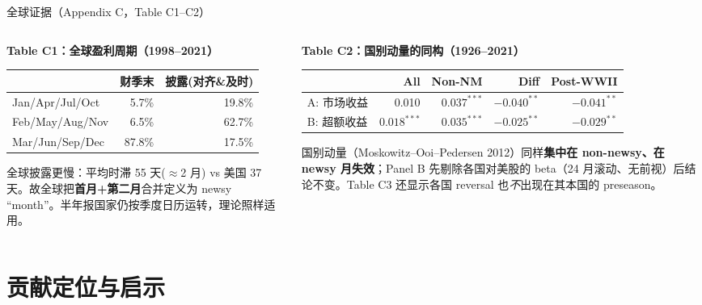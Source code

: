 \documentclass[aspectratio=169,10pt]{beamer}
\newcommand{\tabnote}[1]{\vspace{2pt}{\scriptsize\textcolor{gray!70!black}{#1}}}
\newcommand{\tinytab}{\tiny\setlength{\tabcolsep}{2.2pt}\renewcommand{\arraystretch}{1.08}}
\begin{document}
\begin{frame}{全球证据（Appendix C，Table C1--C2）}
	\begin{columns}[t]
		\begin{column}{0.46\textwidth}
			\textbf{Table C1：全球盈利周期（1998--2021）}
			\tinytab
			\begin{tabular}{lrr}
				\toprule
				& 财季末 & 披露(对齐\&及时) \\
				\midrule
				Jan/Apr/Jul/Oct & 5.7\% & 19.8\% \\
				Feb/May/Aug/Nov & 6.5\% & 62.7\% \\
				Mar/Jun/Sep/Dec & 87.8\% & 17.5\% \\
				\bottomrule
			\end{tabular}
			\par\vspace{3pt}
			\scriptsize 全球披露更慢：平均时滞 55 天($\approx$2 月) vs 美国 37 天。故全球把\textbf{首月+第二月}合并定义为 newsy ``month''。半年报国家仍按季度日历运转，理论照样适用。
		\end{column}
		\begin{column}{0.54\textwidth}
			\textbf{Table C2：国别动量的同构（1926--2021）}
			\tinytab
			\begin{tabular}{lrrrr}
				\toprule
				& All & Non-NM & Diff & Post-WWII \\
				\midrule
				A: 市场收益 & 0.010 & $0.037^{***}$ & $-0.040^{**}$ & $-0.041^{**}$ \\
				B: 超额收益 & $0.018^{***}$ & $0.035^{***}$ & $-0.025^{**}$ & $-0.029^{**}$ \\
				\bottomrule
			\end{tabular}
			\par\vspace{3pt}
			\scriptsize 国别动量（Moskowitz--Ooi--Pedersen 2012）同样\textbf{集中在 non-newsy、在 newsy 月失效}；Panel B 先剔除各国对美股的 beta（24 月滚动、无前视）后结论不变。Table C3 还显示各国 reversal 也\emph{不}出现在其本国的 preseason。
		\end{column}
	\end{columns}
	\vspace{2pt}
	\tabnote{美国是世界最大市场、披露最快且对他国有不对称影响，会"抽走"他国 newsy 月的信息含量；因此全球结果是更苛刻的 out-of-sample。}
\end{frame}

\section{贡献定位与启示}
\end{document}
